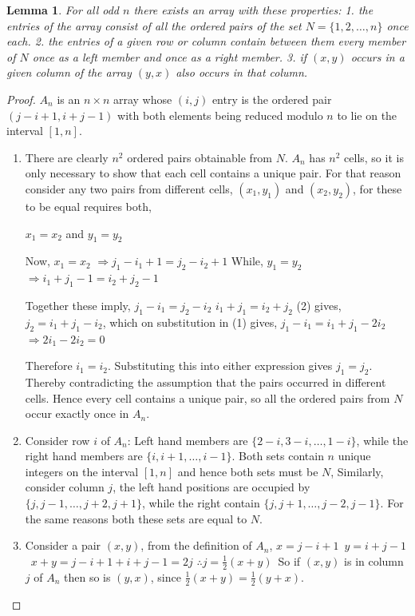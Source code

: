 \documentclass[
  11pt,
  a4paper]{book}
\newtheorem{lemma}[theorem]{Lemma}
\begin{document}
\begin{lemma}
For all odd $n$ there exists an array with these properties:
  1. the entries of the array consist of all the ordered
     pairs of the set $N = \{1, 2, \ldots, n\}$ once each.
  2. the entries of a given row or column contain between
     them every member of $N$ once as a left member and
     once as a right member.
  3. if $(x,y)$ occurs in a given column of the array
     $(y,x)$ also occurs in that column.
\end{lemma}

\begin{proof}
$A_n$ is an $n \times n$ array whose $(i, j)$ entry is the
ordered pair $(j - i + 1, i + j - 1)$ with both elements being
reduced modulo $n$ to lie on the interval $[1, n]$.
\begin{enumerate}
  \item{There are clearly $n^2$ ordered pairs obtainable from
     $N$. $A_n$ has $n^2$ cells, so it is only necessary to
     show that each cell contains a unique pair. For that
     reason consider any two pairs from different cells,
     $(x_1, y_1)$ and $(x_2, y_2)$, for these to be equal
     requires both,

     $x_1 = x_2$ and $y_1 = y_2$

     Now, $x_1 = x_2$ $\Rightarrow j_1-i_1 + 1 = j_2-i_2+1$
     While, $y_1 = y_2$ $\Rightarrow i_1 + j_1 - 1 = i_2 + j_2 - 1$

     Together these imply,
     $j_1 - i_1 = j_2 - i_2 $
     $i_1 + j_1 = i_2 + j_2 $
     (2) gives, $j_2 = i_1 + j_1 - i_2$, which on substitution
     in (1) gives, $j_1 - i_1 = i_1 + j_1 - 2i_2$
     $\Rightarrow 2i_1 - 2i_2 = 0$
     
     Therefore $i_1 = i_2$.
     Substituting this into either expression gives
     $j_1 = j_2$.
     Thereby
     contradicting the assumption that the pairs occurred
     in different cells. Hence every cell contains a unique
     pair, so all the ordered pairs from $N$ occur exactly
     once in $A_n$.}
  \item{Consider row $i$ of $A_n$:
     Left hand members are $\{2-i, 3-i, \ldots, 1-i\}$, while
     the right hand members are $\{i, i + 1, \ldots, i - 1\}$.
     Both sets
     contain $n$ unique integers on the interval $[1,n]$
     and hence both sets must be $N$, Similarly, consider
     column $j$, the left hand positions are occupied by
     $\{j, j - 1, \ldots, j + 2, j + 1\}$, while the right
     contain $\{j, j + 1, \ldots, j - 2, j - 1\}$.
     For the same reasons both these sets are equal to $N$.}
  \item{Consider a pair $(x,y)$, from the definition of $A_n$,
     $x=j-i+1$\ $y=i+j-1$\ $x+y=j-i+1+i+j-1=2j$
     $\therefore j= \frac{1}{2} (x+y)$\ So if $(x,y)$ is in
     column $j$ of $A_n$ then so is $(y,x)$, since
     $\frac{1}{2}(x+y)=\frac{1}{2}(y+x)$.}
\end{enumerate}
\end{proof}
\end{document}
